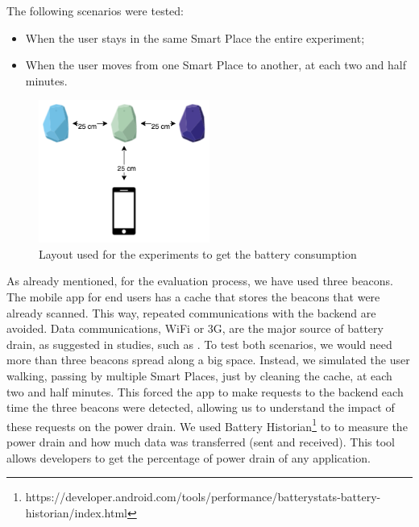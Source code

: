The following scenarios were tested:
\begin{itemize}
  \item
  When the user stays in the same Smart Place the entire experiment;
  \item
  When the user moves from one Smart Place to another, at each two and half minutes.
\end{itemize}



\begin{figure}[!ht]
  \centering
    \includegraphics[width=0.5\textwidth, keepaspectratio]{images/experiments_battery_layout}
    \caption[Layout for experiments of battery consumption]{Layout used for the experiments to get the battery consumption}
    \label{fig:layout_experiments_battery_consumption}
\end{figure}

As already mentioned, for the evaluation process, we have used three  beacons.
The mobile app for end users has a cache that stores the beacons that were already scanned.
This way, repeated communications with the backend are avoided.
Data communications, \gls{WiFi} or \gls{3G}, are the major source of battery drain, as suggested in studies, such as \cite{energy}.
To test both scenarios, we would need more than three beacons spread along a big space.
Instead, we simulated the user walking, passing by multiple Smart Places, just by cleaning the cache, at each two and half minutes.
This forced the app to make requests to the backend each time the three beacons were detected, allowing us to understand the impact of these requests on the power drain.
We used Battery Historian\footnote{https://developer.android.com/tools/performance/batterystats-battery-historian/index.html} to to measure the power drain and how much data was transferred (sent and received). This tool allows developers to get the percentage of power drain of any application.


